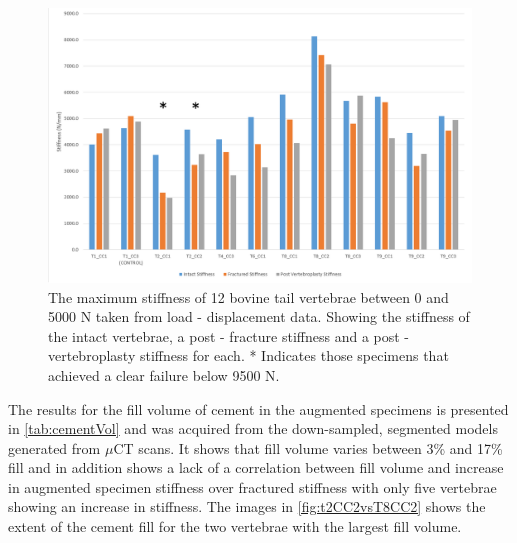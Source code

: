 \begin{figure}[ht!]
\centering
\includegraphics[width=\textwidth]{images/All_experimental_Data.png}
\caption{The maximum stiffness of 12 bovine tail vertebrae between 0 and 5000 N taken from load - displacement data. Showing the stiffness of the intact vertebrae, a post - fracture stiffness and a post - vertebroplasty stiffness for each. * Indicates those specimens that achieved a clear failure below 9500 N.}
\label{fig:allexpData}
\end{figure}

The results for the fill volume of cement in the augmented specimens is
presented in \cref{tab:cementVol} and was acquired from the down-sampled,
segmented models generated from $\mu$CT scans. It shows that fill volume varies
between 3\% and 17\% fill and in addition shows a lack of a correlation between
fill volume and increase in augmented specimen stiffness over fractured
stiffness with only five vertebrae showing an increase in stiffness. The
images in \cref{fig:t2CC2vsT8CC2} shows the extent of the cement fill for the
two vertebrae with the largest fill volume.

